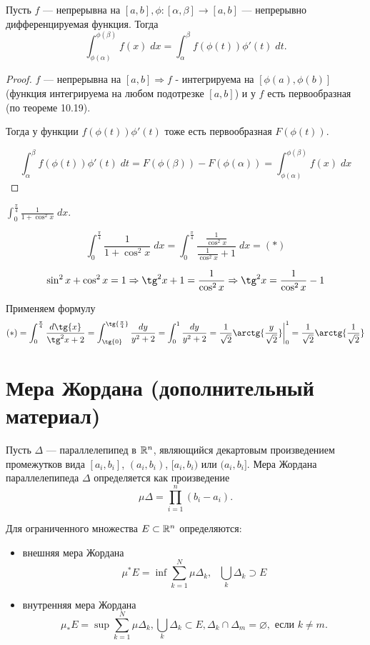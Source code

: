    \begin{theorem}
    	Пусть $f$ — непрерывна на $[a, b], \phi: [\alpha, \beta] \rightarrow [a, b]$ — непрерывно дифференцируемая функция. Тогда
    	\[ \int_{\phi(\alpha)}^{\phi(\beta)} f(x) \; dx = \int_{\alpha}^{\beta} f(\phi(t))\phi'(t) \; dt. \]
    \end{theorem}
    
    \begin{proof}
    	$f$ — непрерывна на $[a, b] \Rightarrow f$ - интегрируема на $[\phi(a), \phi(b)]$ (функция интегрируема на любом подотрезке $[a, b]$) и у $f$ есть первообразная (по теореме 10.19).
    	
    	Тогда у функции $f(\phi(t))\phi'(t)$ тоже есть первообразная $F(\phi(t))$.
    	
    	\[ \int_{\alpha}^{\beta} f(\phi(t))\phi'(t) \; dt = F(\phi(\beta)) - F(\phi(\alpha)) = \int_{\phi(\alpha)}^{\phi{(\beta)}} f(x) \; dx \]
    \end{proof}
    
    \begin{example}
    	$\displaystyle\int_0^{\frac{\pi}{4}} \frac{1}{1 + \cos^2{x}} \; dx.$
    \end{example}
    
    \[ \int_0^{\frac{\pi}{4}} \frac{1}{1 + \cos^2{x}} \; dx = \int_0^{\frac{\pi}{4}} \frac{\frac{1}{\cos^2{x}}}{\frac{1}{\cos^2{x}} + 1} \; dx = (*) \]
    
    \[ \sin^2{x} + \cos^2{x} = 1 \Rightarrow \tg^2{x} + 1 = \frac{1}{\cos^2{x}} \Rightarrow \tg^2{x} = \frac{1}{\cos^2{x}} - 1 \]
    
    Применяем формулу
    \[ (*) = \int_0^{\frac{\pi}{4}} \frac{d\tg{x}}{\tg^2{x} + 2} = \int_{\tg{0}}^{\tg{\frac{\pi}{4}}} \frac{dy}{y^2 + 2} = \int_0^1 \frac{dy}{y^2 + 2} = \frac{1}{\sqrt{2}} \arctg{\frac{y}{\sqrt{2}}} \bigg|_0^1 = \frac{1}{\sqrt{2}} \arctg{\frac{1}{\sqrt{2}}} \]
    
    \section{Мера Жордана (дополнительный материал)}
    Пусть $\Delta$ — параллелепипед в $\mathbb R^n$, являющийся декартовым произведением промежутков вида $[a_i, b_i]$, $(a_i, b_i)$, $[a_i, b_i)$ или $(a_i, b_i]$. Мера Жордана параллелепипеда $\Delta$ определяется как
    произведение
    \[ \mu\Delta = \prod_{i = 1}^{n} (b_i - a_i). \]
    
    Для ограниченного множества $E \subset \mathbb R^n$ определяются:
    \begin{itemize}
    	\item внешняя мера Жордана
    	\[ \mu^{*}E = \inf{\sum_{k = 1}^{N} \mu \Delta_k}, \text{   } \bigcup_k{\Delta_k} \supset E \]
    	\item внутренняя мера Жордана
    	\[ \mu_{*}E = \sup{\sum_{k = 1}^{N} \mu \Delta_k}, \bigcup_k{\Delta_k} \subset E, \Delta_k \cap \Delta_m = \varnothing, \text{ если } k \neq m. \]
    \end{itemize}
    
